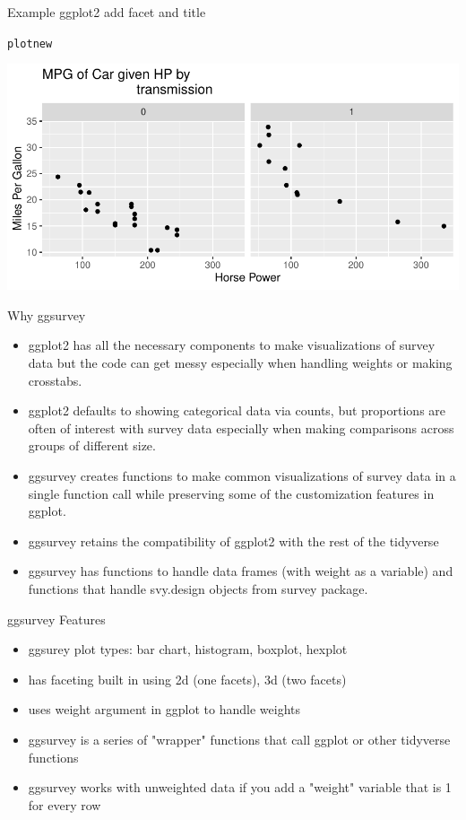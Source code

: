 \documentclass{beamer}\usepackage[]{graphicx}\usepackage[]{color}
\makeatletter
\newcommand{\hlstd}[1]{\textcolor[rgb]{0.345,0.345,0.345}{#1}}%
\newenvironment{kframe}{%
 \def\at@end@of@kframe{}%
 \ifinner\ifhmode%
  \def\at@end@of@kframe{\end{minipage}}%
  \begin{minipage}{\columnwidth}%
 \fi\fi%
 \def\FrameCommand##1{\hskip\@totalleftmargin \hskip-\fboxsep
 \colorbox{shadecolor}{##1}\hskip-\fboxsep
     \hskip-\linewidth \hskip-\@totalleftmargin \hskip\columnwidth}%
 \MakeFramed {\advance\hsize-\width
   \@totalleftmargin\z@ \linewidth\hsize
   \@setminipage}}%
 {\par\unskip\endMakeFramed%
 \at@end@of@kframe}
\newenvironment{knitrout}{}{} %
\makeatother
\begin{document}
\begin{frame}[fragile]{Example ggplot2 add facet and title}
\begin{knitrout}
\color{fgcolor}\begin{kframe}
\begin{alltt}
\hlstd{plotnew}
\end{alltt}
\end{kframe}
\includegraphics[width=0.95\linewidth]{figure/unnamed-chunk-4-1} 
\end{knitrout}
\end{frame}

\begin{frame}[fragile]{Why ggsurvey}
\begin{itemize}
\item ggplot2 has all the necessary components to make visualizations of survey data but the code can get messy especially when handling weights or making crosstabs.
\item ggplot2 defaults to showing categorical data via counts, but proportions are often of interest with survey data especially when making comparisons across groups of different size.
\item ggsurvey creates functions to make common visualizations of survey data in a single function call while preserving some of the customization features in ggplot.
\item ggsurvey retains the compatibility of ggplot2 with the rest of the tidyverse
\item ggsurvey has functions to handle data frames (with weight as a variable) and functions that handle svy.design objects from survey package.
\end{itemize}
\end{frame}

\begin{frame}{ggsurvey Features}
\begin{itemize}
\item ggsurey plot types: bar chart, histogram, boxplot, hexplot
\item has faceting built in using 2d (one facets), 3d (two facets)
\item uses weight argument in ggplot to handle weights
\item ggsurvey is a series of "wrapper" functions that call ggplot or other tidyverse functions
\item ggsurvey works with unweighted data if you add a "weight" variable that is 1 for every row
\end{itemize}
\end{frame}
\end{document}
